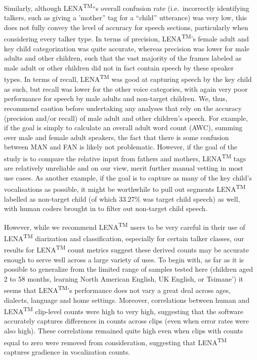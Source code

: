 \documentclass[english,floatsintext,man]{apa6}
\begin{document}
Similarly, although LENA\textsuperscript{TM}\enquote{s overall confusion
rate (i.e.~incorrectly identifying talkers, such as giving a 'mother}
tag for a \enquote{child} utterance) was very low, this does not fully
convey the level of accuracy for speech sections, particularly when
considering every talker type. In terms of precision,
LENA\textsuperscript{TM}'s female adult and key child categorization was
quite accurate, whereas precision was lower for male adults and other
children, such that the vast majority of the frames labeled as male
adult or other children did not in fact contain speech by these speaker
types. In terms of recall, LENA\textsuperscript{TM} was good at
capturing speech by the key child as such, but recall was lower for the
other voice categories, with again very poor performance for speech by
male adults and non-target children. We, thus, recommend caution before
undertaking any analyses that rely on the accuracy (precision and/or
recall) of male adult and other children's speech. For example, if the
goal is simply to calculate an overall adult word count (AWC), summing
over male and female adult speakers, the fact that there is some
confusion between MAN and FAN is likely not problematic. However, if the
goal of the study is to compare the relative input from fathers and
mothers, LENA\textsuperscript{TM} tags are relatively unreliable and on
our view, merit further manual vetting in most use cases. As another
example, if the goal is to capture as many of the key child's
vocalisations as possible, it might be worthwhile to pull out segments
LENA\textsuperscript{TM} labelled as non-target child (of which 33.27\%
was target child speech) as well, with human coders brought in to filter
out non-target child speech.

However, while we recommend LENA\textsuperscript{TM} users to be very
careful in their use of LENA\textsuperscript{TM} diarization and
classification, especially for certain talker classes, our results for
LENA\textsuperscript{TM} count metrics suggest these derived counts may
be accurate enough to serve well across a large variety of uses. To
begin with, as far as it is possible to generalize from the limited
range of samples tested here (children aged 2 to 58 months, learning
North American English, UK English, or Tsimane') it seems that
LENA\textsuperscript{TM}'s performance does not vary a great deal across
ages, dialects, language and home settings. Moreover, correlations
between human and LENA\textsuperscript{TM} clip-level counts were high
to very high, suggesting that the software accurately captures
differences in counts across clips (even when error rates were also
high). These correlations remained quite high even when clips with
counts equal to zero were removed from consideration, suggesting that
LENA\textsuperscript{TM} captures gradience in vocalization counts.
\end{document}
